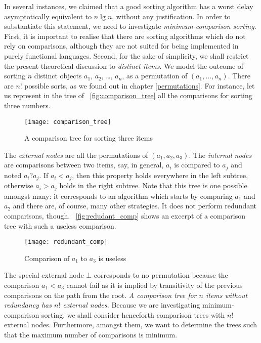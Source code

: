 In several instances, we claimed that a good sorting algorithm has a
worst delay asymptotically equivalent to \(n\lg n\), without any
justification. In order to substantiate this statement, we need to
investigate \emph{minimum\hyp{}comparison sorting}. First, it is
important to realise that there are sorting algorithms which do not
rely on comparisons, although they are not suited for being
implemented in purely functional languages. Second, for the sake of
simpli\-city, we shall restrict the present theoretical discussion to
\emph{distinct items}. We model the outcome of sorting \(n\) distinct
objects \(a_1\), \(a_2\), \ldots, \(a_n\), as a permutation of
\((a_1,\dots,a_n)\). There are \(n!\) possible sorts, as we found out
in chapter \vref{permutations}. For instance, let us represent in the
tree of \fig~\vref{fig:comparison_tree} all the comparisons for
sorting three numbers.
\begin{figure}[t]
\centering
\texttt{[image: comparison\_tree]}
\caption{A comparison tree for sorting three items
\label{fig:comparison_tree}}
\end{figure}
The \emph{external nodes} are all the permutations of
\((a_1,a_2,a_3)\). The \emph{internal nodes} are comparisons between
two items, say, in general, \(a_i\) is compared to \(a_j\) and noted
\(a_i\)?\(a_j\). If \(a_i<a_j\), then this property holds everywhere
in the left subtree, otherwise \(a_i>a_j\) holds in the right
subtree. Note that this tree is one possible amongst many: it
corresponds to an algorithm which starts by comparing \(a_1\) and
\(a_2\) and there are, of course, many other strategies. It does not
perform redundant comparisons, though. \Fig~\vref{fig:redudant_comp}
shows an excerpt of a comparison tree with such a useless comparison.
\begin{figure}[b]
\centering
\texttt{[image: redundant\_comp]}
\caption{Comparison of \(a_1\) to \(a_3\) is useless
\label{fig:redudant_comp}}
\end{figure}
The special external node \(\bot\) corresponds to no permutation
because the comparison \(a_1<a_3\) cannot fail as it is implied by
transitivity of the previous comparisons on the path from the
root. \emph{A comparison tree for \(n\) items without redundancy has
  \(n!\) external nodes.} Because we are investigating
minimum\hyp{}comparison sorting, we shall consider henceforth
comparison trees with \(n!\) external nodes. Furthermore, amongst
them, we want to determine the trees such that the maximum number of
comparisons is minimum.

